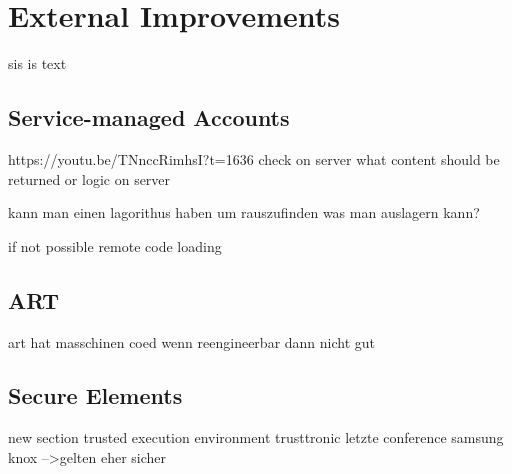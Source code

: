 \section{External Improvements}\label{section:external}
sis is text
\subsection{Service-managed Accounts}
https://youtu.be/TNnccRimhsI?t=1636\newline
check on server what content should be returned or logic on server\newline

kann man einen lagorithus haben um rauszufinden was man auslagern kann?\newline

if not possible remote code loading

\subsection{ART}\label{subsection:external-art}
art hat masschinen coed\newline
wenn reengineerbar dann nicht gut

\subsection{Secure Elements}\label{subsection:external-secure}



new section trusted execution environment
trusttronic letzte conference
samsung knox
-->gelten eher sicher
